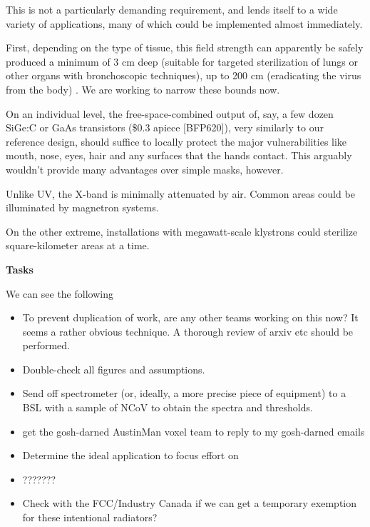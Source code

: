 \documentclass[fleqn,10pt]{paper}
\begin{document}
This is not a particularly demanding requirement, and lends itself to a wide variety of applications, many of which could be implemented almost immediately. 

First, depending on the type of tissue, this field strength can apparently be safely produced a minimum of 3 cm deep (suitable for targeted sterilization of lungs or other organs with bronchoscopic techniques), up to 200 cm (eradicating the virus from the body) \cite{Physical1982}. We are working to narrow these bounds now.

On an individual level, the free-space-combined output of, say, a few dozen SiGe:C or GaAs transistors (\$0.3 apiece [BFP620]), very similarly to our reference design, should suffice to locally protect the major vulnerabilities like mouth, nose, eyes, hair and any surfaces that the hands contact. This arguably wouldn't provide many advantages over simple masks, however. 

Unlike UV, the X-band is minimally attenuated by air. Common areas could be illuminated by magnetron systems.

On the other extreme, installations with megawatt-scale klystrons could sterilize square-kilometer areas at a time. 



{\Large \textbf{Tasks}}

We can see the following 

\begin{itemize}
	\item To prevent duplication of work, are any other teams working on this now? It seems a rather obvious technique. A thorough review of arxiv etc should be performed.
	\item Double-check all figures and assumptions.
	\item Send off spectrometer (or, ideally, a more precise piece of equipment) to a BSL with a sample of NCoV to obtain the spectra and thresholds.
	\item get the gosh-darned AustinMan voxel team to reply to my gosh-darned emails
	\item Determine the ideal application to focus effort on
	\item ???????
	\item Check with the FCC/Industry Canada if we can get a temporary exemption for these intentional radiators?
	
\end{itemize}


\clearpage




\printbibliography[heading=none, title={}]
\end{document}
